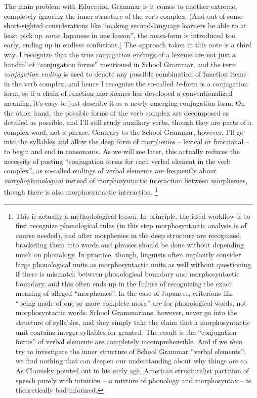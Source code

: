 \documentclass[UTF8, a4paper, oneside, scheme=plain]{ctexart}
\newcommand{\corpus}[1]{\emph{#1}}
\begin{document}
The main problem with Education Grammar is it comes to another extreme,
completely ignoring the inner structure of the verb complex.
(And out of some short-sighted considerations like 
``making second-language learners be able to at least pick up \emph{some} Japanese in one lesson'',
the \corpus{masu}-form is introduced too early,
ending up in endless confusions.)
The approach taken in this note is a third way.
I recognize that the true conjugation endings of a lexeme 
are not just a handful of ``conjugation forms'' mentioned in School Grammar,
and the term \corpus{conjugation ending} is used to denote 
any possible combination of function items in the verb complex,
and hence I recognize the so-called \corpus{te}-form is a conjugation form,
so if a chain of function morphemes has developed a conventionalized meaning,
it's easy to just describe it as a newly emerging conjugation form.
On the other hand,
the possible forms of the verb complex are decomposed as detailed as possible,
and I'll still study auxiliary verbs,
though they are parts of a complex word, not a phrase.
Contrary to the School Grammar, however,
I'll go into the syllables and allow the deep form of morphemes -- lexical or functional --
to begin and end in consonants.
As we will see later,
this actually reduces the necessity of posting 
``conjugation forms for each verbal element in the verb complex'',
as so-called endings of verbal elements 
are frequently about \emph{morphophonological} instead of morphosyntactic interaction between morphemes,
though there is also morphosyntactic interaction.%
\footnote{
    This is actually a methodological lesson.
    In principle, the ideal workflow is to first recognize phonological rules
    (in this step morphosyntactic analysis is of course needed),
    and after morphemes in the deep structure are recognized,
    bracketing them into words and phrases should be done
    without depending much on phonology.
    In practice, though, linguists often implicitly 
    consider large phonological units as morphosyntactic units as well 
    without questioning if there is mismatch between phonological boundary and morphosyntactic boundary,
    and this often ends up in the failure of recognizing the exact meaning of alleged ``morphemes''.
    In the case of Japanese,
    criterions like ``being made of one or more complete mora''
    are for phonological words, not morphosyntactic words.
    School Grammarians, however, never go into the structure of syllables,
    and they simply take the claim that a morphosyntactic unit contains integer syllables for granted.
    The result is the ``conjugation forms'' of verbal elements are completely incomprehensible.
    And if we \emph{then} try to investigate the inner structure of School Grammar ``verbal elements'',
    we find nothing that can deepen our understanding about why things are so.
    As Chomsky pointed out in his early age,
    American structuralist partition of speech purely with intuition 
    -- a mixture of phonology and morphosyntax --
    is theoretically bad-informed.
}\label{fn:morpheme-ill-informed}
\end{document}
